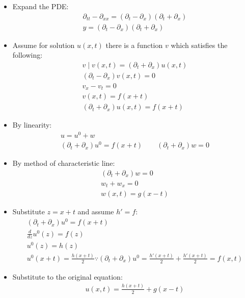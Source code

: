 \documentclass[12pt, a4paper]{article}
\begin{document}
\begin{itemize}
    \item Expand the PDE:
    \begin{gather*}
        \partial_{tt} - \partial_{xx} = (\partial_t - \partial_x)(\partial_t + \partial_x) \\ 
        y = (\partial_t - \partial_x)(\partial_t + \partial_x)
    \end{gather*} 
    \item Assume for solution $u(x, t)$ there is a function $v$ which satisfies the following:
    \begin{gather*}
        v \mid v(x, t) = (\partial_t + \partial_x) u(x, t) \\
        (\partial_t - \partial_x)v(x, t) = 0 \\ 
        v_x - v_t = 0\\
        v(x, t) = f(x + t)\\
        (\partial_t + \partial_x) u(x, t) = f(x + t)
    \end{gather*}
    \item By linearity:
    \begin{gather*}
        u = u^0 + w \\
        (\partial_t + \partial_x)u^0 = f(x + t) \qquad (\partial_t + \partial_x)w = 0
    \end{gather*}
    \item By method of characteristic line:
    \begin{gather*}
        (\partial_t + \partial_x)w = 0 \\
        w_t + w_x = 0 \\
        w(x, t) = g(x - t)
    \end{gather*}
    \item Substitute $z = x+t$ and assume $h' = f$:
    \begin{gather*}
        (\partial_t + \partial_x)u^0 = f(x + t) \\
        \frac{d}{dz}u^0(z) = f(z)\\
        u^0(z) = h(z)\\
        u^0(x+t) = \frac{h(x+t)}{2} \because (\partial_t + \partial_x)u^0 = \frac{h'(x+t)}{2} + \frac{h'(x+t)}{2} = f(x, t)
    \end{gather*}
    \item Substitute to the original equation:
    \begin{gather*}
        u(x, t) = \frac{h(x+t)}{2} + g(x-t)
    \end{gather*}
\end{itemize}
\vspace{0.3em}
    
\end{document}
